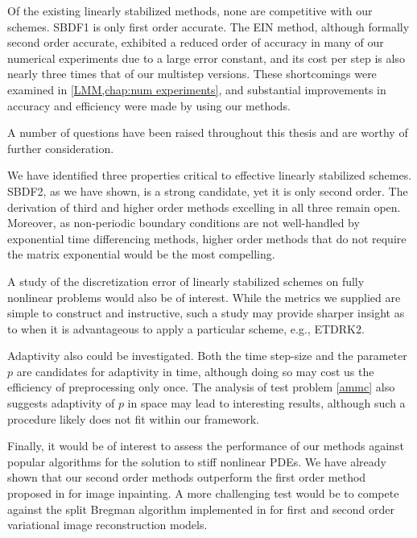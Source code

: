 Of the existing linearly stabilized methods, none are competitive with our schemes. 
SBDF1 is only first order accurate. The EIN method, although formally second order accurate, exhibited a reduced order of accuracy in many of our numerical experiments due to a large error constant, and its cost per step is also nearly three times that of our multistep versions. These shortcomings were examined in \cref{LMM,chap:num experiments}, and substantial improvements in accuracy and efficiency were made by using our methods.

A number of questions have been raised throughout this thesis and are worthy of further consideration. 

We have identified three properties critical to effective linearly stabilized schemes.  SBDF2, as we have shown, is a strong candidate, yet it is only second order. The derivation of third and higher order methods excelling in all three remain open. Moreover, as non-periodic boundary conditions are not well-handled by exponential time differencing methods, higher order methods that do not require the matrix exponential would be the most compelling.

A study of the discretization error of linearly stabilized schemes on fully nonlinear problems would also be of interest. While the metrics we supplied are simple to construct and instructive, such a study may provide sharper insight as to when it is advantageous to apply a particular scheme, e.g., ETDRK2. 

Adaptivity also could be investigated. Both the time step-size and the parameter $p$ are candidates for adaptivity in time, although doing so may cost us the efficiency of preprocessing only once. The analysis of test problem \cref{ammc} also suggests adaptivity of $p$ in space may lead to interesting results, although such a procedure likely does not fit within our framework. 

Finally, it would be of interest to assess the performance of our methods against popular algorithms for the solution to stiff nonlinear PDEs. We have already shown that our second order methods outperform the first order method proposed in \cite{schonlieb2011unconditionally} for image inpainting. A more challenging test would be to compete against the split Bregman algorithm \cite{goldstein2009split} implemented in \cite{papafitsoros2014combined,papafitsoros2013combined} for first and second order variational image reconstruction models. 
